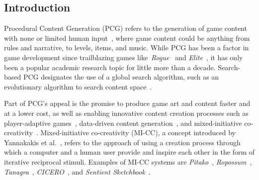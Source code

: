 \subsection{Introduction}


Procedural Content Generation (PCG) refers to the generation of game content with none or limited human input~, where game content could be anything from rules and narrative, to levels, items, and music. While PCG has been a factor in game development since trailblazing games like~\emph{Rogue}~ and \emph{Elite}~, it has only been a popular academic research topic for little more than a decade. Search-based PCG designates the use of a global search algorithm, such as an evolutionary algorithm to search content space~.

Part of PCG's appeal is the promise to produce game art and content faster and at a lower cost, as well as enabling innovative content creation processes such as player-adaptive games~, data-driven content generation~, and mixed-initiative co-creativity~. Mixed-initiative co-creativity (MI-CC), a concept introduced by Yannakakis et al.~, refers to the approach of using a creation process through which a computer and a human user provide %
and inspire each other in the form of iterative reciprocal stimuli. Examples of MI-CC systems are \textit{Pitako}~, \textit{Ropossum}~, \textit{Tanagra}~, \textit{CICERO}~, and \textit{Sentient Sketchbook}~. 

